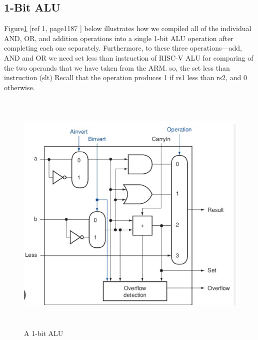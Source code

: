 \documentclass[a4paper,12pt,english]{report}
\begin{document}
	\subsection{1-Bit ALU}
Figure\ref{ref: set less than} [ref 1, page1187 ] below illustrates how we compiled all of the individual AND, OR, and addition operations into a single 1-bit ALU operation after completing each one separately. Furthermore, to these three operations—add, AND and OR we need set less than instruction of RISC-V ALU for comparing of the two operands that we have taken from the ARM.
so, the set less than instruction (slt) Recall that the operation produces 1 if rs1  less than rs2, and 0 otherwise.
 \begin{figure}[ht]
	\centering
	\includegraphics[width=14cm, height=12cm]{1bit alu} %
	\caption{A 1-bit ALU }
	\label{ref: set less than}
\end{figure}
\newpage
\end{document}
